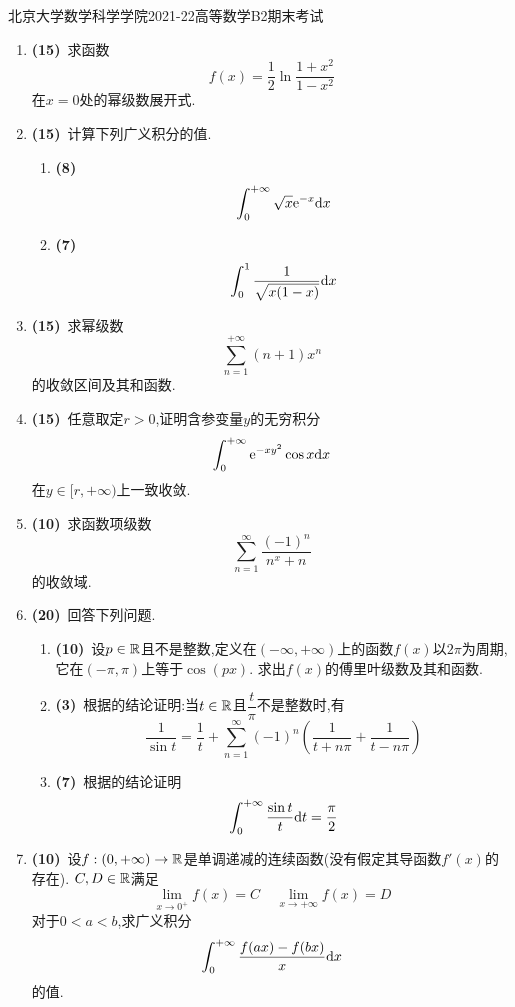 \documentclass{ctexart}
\begin{document}
\pagestyle{empty}
\begin{center}\Large
    北京大学数学科学学院2021-22高等数学B2期末考试
\end{center}
\begin{enumerate}[leftmargin=*,label=\textbf{\arabic*.},topsep=0pt,parsep=0pt,itemsep=0pt,partopsep=0pt]
    \item \textbf{(15)}\ 求函数
        \[f(x)=\dfrac12\ln\dfrac{1+x^2}{1-x^2}\]
        在$x=0$处的幂级数展开式.

    \item \textbf{(15)}\ 计算下列广义积分的值.
        \begin{enumerate}[label=\tbf{(\arabic*)},topsep=0pt,parsep=0pt,itemsep=0pt,partopsep=0pt]
            \item \textbf{(8)}
                \[\int_0^{+\infty}\sqrt{x}\mathrm{e}^{-x}\mathrm{d} x\]
            \item \textbf{(7)}\ 
                \[\int_0^1\dfrac{1}{\sqrt{x(1-x)}}\mathrm{d} x\]
        \end{enumerate}

    \item \textbf{(15)}\ 求幂级数
        \[\sum_{n=1}^{+\infty}(n+1)x^n\]
        的收敛区间及其和函数.

    \item \textbf{(15)}\ 任意取定$r>0$,证明含参变量$y$的无穷积分
        \[\int_0^{+\infty}\mathrm{e}^{-xy^2}\cos x\mathrm{d} x\]
        在$y\in[r,+\infty)$上一致收敛.
        
    \item \textbf{(10)}\ 求函数项级数
        \[\sum_{n=1}^\infty\dfrac{(-1)^n}{n^x+n}\]
        的收敛域.

    \item \textbf{(20)}\ 回答下列问题.
        \begin{enumerate}[label=\tbf{(\arabic*)},topsep=0pt,parsep=0pt,itemsep=0pt,partopsep=0pt]
            \item \textbf{(10\songti{分})}\ 设$p\in\mathbb{R}$且不是整数,定义在$(-\infty,+\infty)$上的函数$f(x)$以$2\pi$为周期,它在$(-\pi,\pi)$上等于$\cos(px)$.%
                求出$f(x)$的傅里叶级数及其和函数.
            \item \textbf{(3)}\ 根据的结论证明:当$t\in\mathbb{R}$且$\dfrac{t}{\pi}$不是整数时,有
                \[\dfrac{1}{\sin t}=\dfrac1t+\sum_{n=1}^{\infty}(-1)^n\left(\dfrac{1}{t+n\pi}+\dfrac{1}{t-n\pi}\right)\]
            \item \textbf{(7\songti{分})}\ 根据\tbf{(2)}的结论证明
                \[\int_0^{+\infty}\dfrac{\sin t}{t}\mathrm{d} t=\dfrac\pi2\]

        \end{enumerate}
    \item \textbf{(10)}\ 设$f:(0,+\infty)\to\mathbb{R}$是单调递减的连续函数(没有假定其导函数$f'(x)$的存在).%
        $C,D\in\mathbb{R}$满足
        \[\lim_{x\to0^+}f(x)=C\ \ \ \ \ \lim_{x\to+\infty}f(x)=D\]
        对于$0<a<b$,求广义积分
        \[\int_0^{+\infty}\dfrac{f(ax)-f(bx)}{x}\mathrm{d} x\]
        的值.
\end{enumerate}
\end{document}
